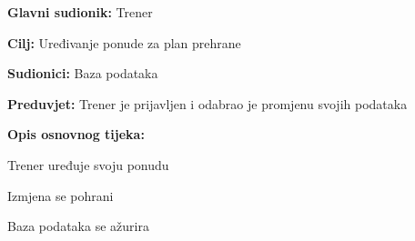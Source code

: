				\noindent {}
				\begin{packed_item}
					
					\item \textbf{Glavni sudionik: } Trener
					\item  \textbf{Cilj:} Uređivanje ponude za plan prehrane
					\item  \textbf{Sudionici:} Baza podataka
					\item  \textbf{Preduvjet:} Trener je prijavljen i odabrao je promjenu svojih podataka
					\item  \textbf{Opis osnovnog tijeka:}
					
					\item[] \begin{packed_enum}
						
						\item Trener uređuje svoju ponudu
						\item Izmjena se pohrani
						\item Baza podataka se ažurira
					\end{packed_enum}
					
				\end{packed_item}
				
